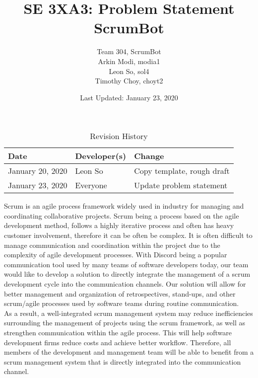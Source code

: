 \documentclass[12pt]{article}
\title{SE 3XA3: Problem Statement\\ScrumBot}
\author{
	Team 304, ScrumBot
		\\ Arkin Modi, modia1
        \\ Leon So, sol4
        \\ Timothy Choy, choyt2
}
\date{Last Updated: January 23, 2020}
\begin{document}
\begin{table}[hp]
    \caption{Revision History} \label{TblRevisionHistory}
    \begin{tabularx}{\textwidth}{llX}
        \toprule
            \textbf{Date} & \textbf{Developer(s)} & \textbf{Change}\\
        \midrule
            January 20, 2020 & Leon So & Copy template, rough draft\\
            January 23, 2020 & Everyone & Update problem statement\\
        \bottomrule
    \end{tabularx}
\end{table}
\newpage

\maketitle

Scrum is an agile process framework widely used in industry for managing and coordinating collaborative projects. Scrum being a process based on the agile development method, follows a highly iterative process and often has heavy customer involvement, therefore it can be often be complex. It is often difficult to manage communication and coordination within the project due to the complexity of agile development processes. With Discord being a popular communication tool used by many teams of software developers today, our team would like to develop a solution to directly integrate the management of a scrum development cycle into the communication channels. Our solution will allow for better management and organization of retrospectives, stand-ups, and other scrum/agile processes used by software teams during routine communication.\\

As a result, a well-integrated scrum management system may reduce inefficiencies surrounding the management of projects using the scrum framework, as well as strengthen communication within the agile process. This will help software development firms reduce costs and achieve better workflow. Therefore, all members of the development and management team will be able to benefit from a scrum management system that is directly integrated into the communication channel.
\end{document}

